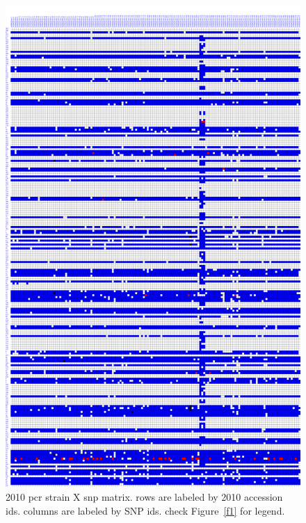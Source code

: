 \documentclass[a3paper,10pt]{article}
\begin{document}
\begin{figure}
\includegraphics[width=1\textwidth,height=1\textheight]{figures/2010pcr_with_sequenom_149snps_accession2ecotype_complete_y3.png}
\caption{2010 pcr strain X snp matrix. rows are labeled by 2010 accession ids. columns are labeled by SNP ids. check Figure~\ref{f1} for legend.}\label{f2}
\end{figure}
\end{document}
